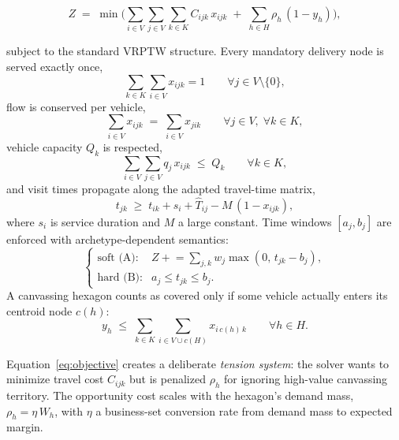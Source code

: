 \documentclass[11pt,a4paper,twocolumn]{article}
\begin{document}
\begin{equation}
  \label{eq:objective}
  Z \;=\; \min \Biggl(
    \sum_{i \in V} \sum_{j \in V} \sum_{k \in K} C_{ijk}\, x_{ijk}
    \;+\; \sum_{h \in H} \rho_h \,(1 - y_h)
  \Biggr),
\end{equation}

subject to the standard VRPTW structure. Every mandatory delivery node is
served exactly once,
\begin{equation}
  \sum_{k \in K} \sum_{i \in V} x_{ijk} = 1
  \qquad \forall j \in V \setminus \{0\},
\end{equation}
flow is conserved per vehicle,
\begin{equation}
  \sum_{i \in V} x_{ijk} \;=\; \sum_{i \in V} x_{jik}
  \qquad \forall j \in V,\; \forall k \in K,
\end{equation}
vehicle capacity $Q_k$ is respected,
\begin{equation}
  \sum_{i \in V} \sum_{j \in V} q_j \, x_{ijk} \;\le\; Q_k
  \qquad \forall k \in K,
\end{equation}
and visit times propagate along the adapted travel-time matrix,
\begin{equation}
  \label{eq:timeprop}
  t_{jk} \;\ge\; t_{ik} + s_i + \widehat{T}_{ij}
    - M\,(1 - x_{ijk}),
\end{equation}
where $s_i$ is service duration and $M$ a large constant. Time windows
$[a_j, b_j]$ are enforced with archetype-dependent semantics:
\begin{equation}
  \label{eq:tw}
  \begin{cases}
    \text{soft (A):} &
      Z \mathrel{+}= \sum_{j,k} w_j \max(0,\, t_{jk} - b_j),\\[0.4em]
    \text{hard (B):} &
      a_j \le t_{jk} \le b_j .
  \end{cases}
\end{equation}
A canvassing hexagon counts as covered only if some vehicle actually
enters its centroid node $c(h)$:
\begin{equation}
  y_h \;\le\; \sum_{k \in K} \sum_{i \in V \cup c(H)} x_{i\,c(h)\,k}
  \qquad \forall h \in H.
\end{equation}

Equation~\eqref{eq:objective} creates a deliberate \emph{tension system}:
the solver wants to minimize travel cost $C_{ijk}$ but is penalized
$\rho_h$ for ignoring high-value canvassing territory. The opportunity
cost scales with the hexagon's demand mass, $\rho_h = \eta\, W_h$, with
$\eta$ a business-set conversion rate from demand mass to expected margin.
\end{document}
